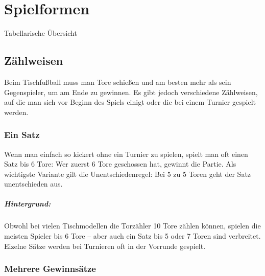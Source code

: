 \chapter{Spielformen}
\label{spielformen}

Tabellarische Übersicht


\section{Zählweisen}
\label{spielformen:zaehlweisen}

Beim Tischfußball muss man Tore schießen und am besten mehr als sein Gegenspieler, um am Ende zu gewinnen.
Es gibt jedoch verschiedene Zählweisen, auf die man sich vor Beginn des Spiels einigt oder die bei einem Turnier gespielt werden. 
\subsection{Ein Satz}
\label{spielformen:zaehlweisen:einsatz}

Wenn man einfach so kickert ohne ein Turnier zu spielen, spielt man oft einen Satz bis 6 Tore: Wer zuerst 6 Tore geschossen hat, gewinnt die Partie.
Als wichtigste Variante gilt die Unentschiedenregel: Bei 5 zu 5 Toren geht der Satz unentschieden aus.

\paragraph{Hintergrund:}
Obwohl bei vielen Tischmodellen die Torzähler 10 Tore zählen können, spielen die meisten Spieler bis 6 Tore -- aber auch ein Satz bis 5 oder 7 Toren sind verbreitet.
Eizelne Sätze werden bei Turnieren oft in der Vorrunde gespielt.


\subsection{Mehrere Gewinnsätze}
\label{spielformen:zaehlweisen:gewinnsaetze}

